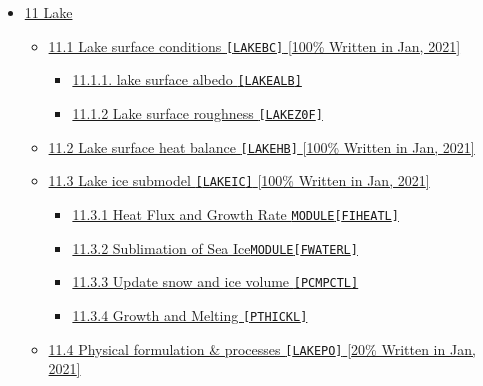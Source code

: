 \begin{itemize}
\tightlist
\item
  \protect\hyperlink{11-lake}{11 Lake}

  \begin{itemize}
  \tightlist
  \item
    \protect\hyperlink{111-lake-surface-conditions-lakebc-100-written-in-jan-2021}{11.1
    Lake surface conditions \texttt{{[}LAKEBC{]}} {[}100\% Written in
    Jan, 2021{]}}

    \begin{itemize}
    \tightlist
    \item
      \protect\hyperlink{1111-lake-surface-albedo-lakealb}{11.1.1. lake
      surface albedo \texttt{{[}LAKEALB{]}}}
    \item
      \protect\hyperlink{1112-lake-surface-roughness-lakez0f}{11.1.2
      Lake surface roughness \texttt{{[}LAKEZ0F{]}}}
    \end{itemize}
  \item
    \protect\hyperlink{112-lake-surface-heat-balance-lakehb-100-written-in-jan-2021}{11.2
    Lake surface heat balance \texttt{{[}LAKEHB{]}} {[}100\% Written in
    Jan, 2021{]}}
  \item
    \protect\hyperlink{113-lake-ice-submodel-lakeic-100-written-in-jan-2021}{11.3
    Lake ice submodel \texttt{{[}LAKEIC{]}} {[}100\% Written in Jan,
    2021{]}}

    \begin{itemize}
    \tightlist
    \item
      \protect\hyperlink{1131-heat-flux-and-growth-rate-modulefiheatl}{11.3.1
      Heat Flux and Growth Rate \texttt{MODULE{[}FIHEATL{]}}}
    \item
      \protect\hyperlink{1132-sublimation-of-sea-icemodulefwaterl}{11.3.2
      Sublimation of Sea Ice\texttt{MODULE{[}FWATERL{]}}}
    \item
      \protect\hyperlink{1133-update-snow-and-ice-volume-pcmpctl}{11.3.3
      Update snow and ice volume \texttt{{[}PCMPCTL{]}}}
    \item
      \protect\hyperlink{1134-growth-and-melting-pthickl}{11.3.4 Growth
      and Melting \texttt{{[}PTHICKL{]}}}
    \end{itemize}
  \item
    \protect\hyperlink{114-physical-formulation-processes-lakepo-20-written-in-jan-2021}{11.4
    Physical formulation \& processes \texttt{{[}LAKEPO{]}} {[}20\%
    Written in Jan, 2021{]}}


\end{itemize}
\end{itemize}

